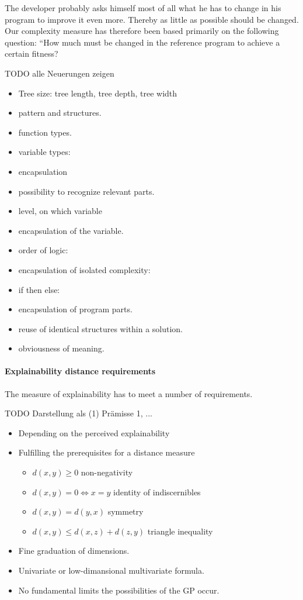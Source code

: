 The developer probably asks himself most of all what he has to change in his program to improve it even more. Thereby as little as possible should be changed. Our complexity measure has therefore been based primarily on the following question: ``How much must be changed in the reference program to achieve a certain fitness?

TODO alle Neuerungen zeigen

\begin{itemize}
    \item Tree size: tree length, tree depth, tree width
    \item pattern and structures.
    \item function types.
    \item variable types:
    \item encapsulation
    \item possibility to recognize relevant parts. 
    \item level, on which variable
    \item encapsulation of the variable.
    \item order of logic: 
    \item encapsulation of isolated complexity:
    \item if then else:
    \item encapsulation of program parts.
    \item reuse of identical structures within a solution.
    \item obviousness of meaning. 
\end{itemize}

\paragraph{Explainability distance requirements}
The measure of explainability has to meet a number of requirements. \label{xaiMeasurementRequirements}

TODO Darstellung als (1) Prämisse 1, ...
\begin{itemize}
    \item Depending on the perceived explainability
    \item Fulfilling the prerequisites for a distance measure
        \begin{itemize}
        \item $d(x,y) \ge 0$  non-negativity
        \item $d(x,y) = 0 \Leftrightarrow x = y$  identity of indiscernibles
        \item $d(x,y) = d(y,x)$  symmetry
        \item $d(x,y) \le d(x,z) + d(z,y)$  triangle inequality
        \end{itemize}
    \item Fine graduation of dimensions.
    \item Univariate or low-dimansional multivariate formula.
    \item No fundamental limits the possibilities of the GP occur.
\end{itemize}

